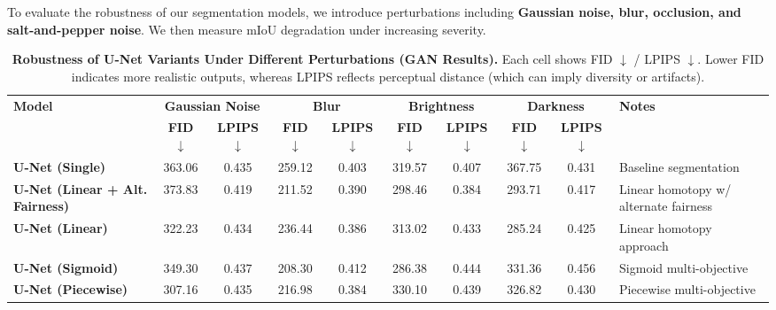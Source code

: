 To evaluate the robustness of our segmentation models, we introduce perturbations including \textbf{Gaussian noise, blur, occlusion, and salt-and-pepper noise}. We then measure mIoU degradation under increasing severity.

\begin{table*}[ht]
    \centering
    \caption{
        \textbf{Robustness of U-Net Variants Under Different Perturbations (GAN Results).}
        Each cell shows FID $\downarrow$ / LPIPS $\downarrow$. Lower FID indicates more realistic outputs, whereas LPIPS reflects perceptual distance (which can imply diversity or artifacts). 
    }
    \label{tab:robustness_results}
    \begin{adjustbox}{max width=\textwidth}
    \begin{tabular}{lccccccccl}
    \toprule
    \multirow{2}{*}{\textbf{Model}} & 
    \multicolumn{2}{c}{\textbf{Gaussian Noise}} & 
    \multicolumn{2}{c}{\textbf{Blur}} &
    \multicolumn{2}{c}{\textbf{Brightness}} &
    \multicolumn{2}{c}{\textbf{Darkness}} &
    \multirow{2}{*}{\textbf{Notes}} \\ 
    \cmidrule(r){2-9}
    & \textbf{FID $\downarrow$} & \textbf{LPIPS $\downarrow$} & \textbf{FID $\downarrow$} & \textbf{LPIPS $\downarrow$} & \textbf{FID $\downarrow$} & \textbf{LPIPS $\downarrow$} & \textbf{FID $\downarrow$} & \textbf{LPIPS $\downarrow$} & \\
    \midrule

    \textbf{U-Net (Single)} &
    363.06 & 0.435 &
    259.12 & 0.403 &
    319.57 & 0.407 &
    367.75 & 0.431 &
    Baseline segmentation \\

    \textbf{U-Net (Linear + Alt. Fairness)} &
    373.83 & 0.419 &
    211.52 & 0.390 &
    298.46 & 0.384 &
    293.71 & 0.417 &
    Linear homotopy w/ alternate fairness \\

    \textbf{U-Net (Linear)} &
    322.23 & 0.434 &
    236.44 & 0.386 &
    313.02 & 0.433 &
    285.24 & 0.425 &
    Linear homotopy approach \\

    \textbf{U-Net (Sigmoid)} &
    349.30 & 0.437 &
    208.30 & 0.412 &
    286.38 & 0.444 &
    331.36 & 0.456 &
    Sigmoid multi-objective \\

    \textbf{U-Net (Piecewise)} &
    307.16 & 0.435 &
    216.98 & 0.384 &
    330.10 & 0.439 &
    326.82 & 0.430 &
    Piecewise multi-objective \\

    \bottomrule
    \end{tabular}
    \end{adjustbox}
\end{table*}

